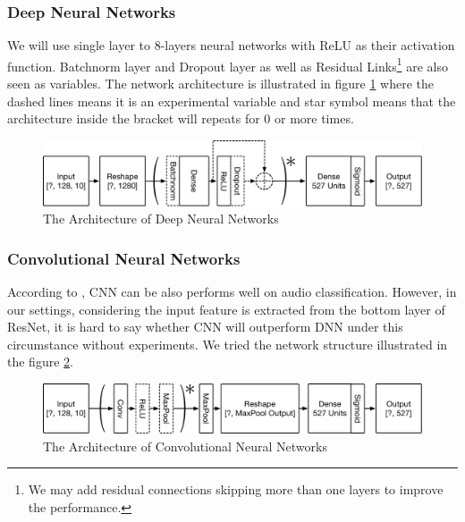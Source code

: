 \documentclass{article}
\begin{document}
			\subsubsection*{Deep Neural Networks}
				We will use single layer to 8-layers neural networks with ReLU as their activation function. Batchnorm layer\cite{DBLP:journals/corr/IoffeS15} and Dropout layer\cite{DBLP:journals/corr/abs-1207-0580} as well as Residual Links\footnote{We may add residual connections skipping more than one layers to improve the performance.} are also seen as variables. The network architecture is illustrated in figure \ref{fig:dnn-arch} where the dashed lines means it is an experimental variable and star symbol means that the architecture inside the bracket will repeats for 0 or more times.

				\begin{figure}[htbp]
					\centering
					\includegraphics[width=13cm]{figures/dnn-arch.pdf}
					\caption{\label{fig:dnn-arch}The Architecture of Deep Neural Networks}
				\end{figure}

			\subsubsection*{Convolutional Neural Networks}
				According to \cite{45611}, CNN can be also performs well on audio classification. However, in our settings, considering the input feature is extracted from the bottom layer of ResNet, it is hard to say whether CNN will outperform DNN under this circumstance without experiments. We tried the network structure illustrated in the figure \ref{fig:cnn-arch}.
				\begin{figure}[htbp]
					\centering
					\includegraphics[width=13cm]{figures/cnn-arch.pdf}
					\caption{\label{fig:cnn-arch}The Architecture of Convolutional Neural Networks}
				\end{figure}
\end{document}
